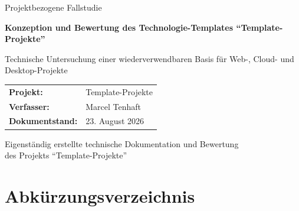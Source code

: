 \documentclass[11pt,a4paper]{article}
\newcommand{\arbeitstitel}{Konzeption und Bewertung des
  Technologie-Templates \enquote{Template-Projekte}}
\newcommand{\arbeituntertitel}{Technische Untersuchung einer
  wiederverwendbaren Basis für Web-, Cloud- und Desktop-Projekte}
\newcommand{\arbeitart}{Projektbezogene Fallstudie}
\newcommand{\projektname}{Template-Projekte}
\newcommand{\autorname}{Marcel Tenhaft}
\newcommand{\dokumentstand}{23. August 2026}
\begin{document}
\hypersetup{pageanchor=false}
\thispagestyle{empty}

\begin{titlepage}
  \centering

  {\Large \arbeitart \par}
  \vspace{1.8cm}

  {\bfseries\LARGE \arbeitstitel \par}
  \vspace{0.6cm}

  {\large \arbeituntertitel \par}
  \vspace{2.5cm}

  \begin{tabularx}{0.82\textwidth}{@{}lX@{}}
    \textbf{Projekt:}        & \projektname \\
    \textbf{Verfasser:}      & \autorname \\
    \textbf{Dokumentstand:}  & \dokumentstand \\
  \end{tabularx}

  \vfill

  {\small
  Eigenständig erstellte technische Dokumentation und Bewertung\\
  des Projekts \enquote{\projektname}
  \par}
\end{titlepage}

\hypersetup{pageanchor=true}
\setcounter{page}{1}

\clearpage
\tableofcontents

\clearpage
\renewcommand{\listfigurename}{Abbildungsverzeichnis}
{}
\listoffigures

\clearpage
\renewcommand{\listtablename}{Tabellenverzeichnis}
{}
\listoftables

\clearpage
{}
\section*{Abkürzungsverzeichnis}
\end{document}
